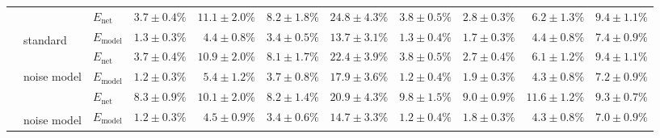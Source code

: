 \begin{sidewaystable}
\begin{tabular}{p{2.2cm} p{1.7cm} l r r r r r r r r }
	\\
	& & 
	$E_\mathrm{net}$ &
	\cellcolor{White!82!SteelBlue}$3.7 \pm 0.4\%$ & \cellcolor{White!44!SteelBlue}$11.1 \pm 2.0\%$ & \cellcolor{White!63!SteelBlue}$8.2 \pm 1.8\%$ & \cellcolor{White!32!SteelBlue}$24.8 \pm 4.3\%$ & \cellcolor{White!82!SteelBlue}$3.8 \pm 0.5\%$ & \cellcolor{White!82!SteelBlue}$2.8 \pm 0.3\%$ & \cellcolor{White!82!SteelBlue}$6.2 \pm 1.3\%$ & \cellcolor{White!44!SteelBlue}$9.4 \pm 1.1\%$
	\\\cmidrule(l){2-11}
	&
	\multirow{2}{1.7cm}{\raggedleft %
	standard\textsuperscript{\dag}} &
	$E_\mathrm{model}$ & 
	\color{Gray}$1.3 \pm 0.3\%$ & \color{Gray}$4.4 \pm 0.8\%$ & \color{Gray}$\mathbf{3.4 \pm 0.5\%}$ & \color{Gray}$13.7 \pm 3.1\%$ & \color{Gray}$1.3 \pm 0.4\%$ & \color{Gray}$1.7 \pm 0.3\%$ & \color{Gray}$4.4 \pm 0.8\%$ & \color{Gray}$7.4 \pm 0.9\%$
	\\
	& & 
	$E_\mathrm{net}$ &
	\cellcolor{White!88!SteelBlue}$3.7 \pm 0.4\%$ & \cellcolor{White!50!SteelBlue}$10.9 \pm 2.0\%$ & \cellcolor{White!69!SteelBlue}$8.1 \pm 1.7\%$ & \cellcolor{White!50!SteelBlue}$22.4 \pm 3.9\%$ & \cellcolor{White!88!SteelBlue}$3.8 \pm 0.5\%$ & \cellcolor{White!88!SteelBlue}$2.7 \pm 0.4\%$ & \cellcolor{White!88!SteelBlue}$6.1 \pm 1.2\%$ & \cellcolor{White!50!SteelBlue}$9.4 \pm 1.1\%$
	\\\cmidrule(l){2-11}
	&
	\multirow{2}{1.7cm}{\raggedleft %
	noise model} &
	$E_\mathrm{model}$ & 
	\color{Gray}$1.2 \pm 0.3\%$ & \color{Gray}$5.4 \pm 1.2\%$ & \color{Gray}$3.7 \pm 0.8\%$ & \color{Gray}$17.9 \pm 3.6\%$ & \color{Gray}$1.2 \pm 0.4\%$ & \color{Gray}$1.9 \pm 0.3\%$ & \color{Gray}$4.3 \pm 0.8\%$ & \color{Gray}$7.2 \pm 0.9\%$
	\\
	& & 
	$E_\mathrm{net}$ &
	\cellcolor{White!13!SteelBlue}$8.3 \pm 0.9\%$ & \cellcolor{White!57!SteelBlue}$10.1 \pm 2.0\%$ & \cellcolor{White!57!SteelBlue}$8.2 \pm 1.4\%$ & \cellcolor{White!63!SteelBlue}$20.9 \pm 4.3\%$ & \cellcolor{White!13!SteelBlue}$9.8 \pm 1.5\%$ & \cellcolor{White!19!SteelBlue}$9.0 \pm 0.9\%$ & \cellcolor{White!19!SteelBlue}$11.6 \pm 1.2\%$ & \cellcolor{White!57!SteelBlue}$9.3 \pm 0.7\%$
	\\\cmidrule(l){2-11}
	&
	\multirow{2}{1.7cm}{\raggedleft %
	noise model\textsuperscript{\dag}} &
	$E_\mathrm{model}$ & 
	\color{Gray}$1.2 \pm 0.3\%$ & \color{Gray}$4.5 \pm 0.9\%$ & \color{Gray}$3.4 \pm 0.6\%$ & \color{Gray}$14.7 \pm 3.3\%$ & \color{Gray}$\mathbf{1.2 \pm 0.4\%}$ & \color{Gray}$1.8 \pm 0.3\%$ & \color{Gray}$4.3 \pm 0.8\%$ & \color{Gray}$7.0 \pm 0.9\%$
	\\

\end{tabular}
\end{sidewaystable}
